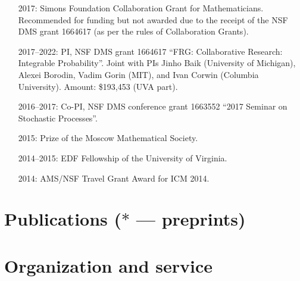 \documentclass[letterpaper,11pt]{article}
\begin{document}
\begin{itemize}
		
	\item
	      [2017:] Simons Foundation Collaboration Grant for
	      Mathematicians. Recommended for funding but not awarded due to
	      the receipt of the NSF DMS grant 1664617 (as per the rules of Collaboration
	      Grants).
	\item
			[2017--2022:] PI, NSF DMS grant 1664617
	      ``FRG: Collaborative Research: Integrable Probability''.
	      Joint with PIs Jinho Baik (University of Michigan), Alexei
	      Borodin, Vadim Gorin (MIT), and Ivan Corwin (Columbia University). Amount:
	      \$193,453 (UVA part).
	\item
		[2016--2017:] Co-PI,
	      NSF DMS conference grant 1663552 ``2017 Seminar on Stochastic
				Processes''.
	\item
	      [2015:] Prize of the Moscow Mathematical Society.
	\item
	      [2014--2015:] EDF Fellowship of the University of Virginia.
	\item
	      [2014:] AMS/NSF Travel Grant Award for ICM 2014.
\end{itemize}

\section*{Publications ($*$ --- preprints)}



\section*{Organization and service}
\end{document}
